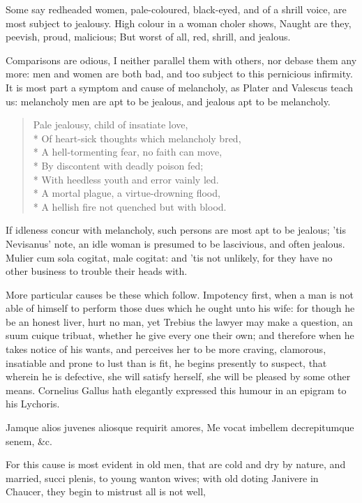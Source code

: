 {Some say redheaded women, pale-coloured, black-eyed, and of a
shrill voice, are most subject to jealousy.
High colour in a woman choler shows,
Naught are they, peevish, proud, malicious;
But worst of all, red, shrill, and jealous.

Comparisons are odious, I neither parallel them with others, nor debase
them any more: men and women are both bad, and too subject to this
pernicious infirmity. It is most part a symptom and cause of
melancholy, as Plater and Valescus teach us: melancholy men are apt to
be jealous, and jealous apt to be melancholy.

\begin{verse}
Pale jealousy, child of insatiate love,\\*
Of heart-sick thoughts which melancholy bred,\\*
A hell-tormenting fear, no faith can move,\\*
By discontent with deadly poison fed;\\*
With heedless youth and error vainly led.\\*
A mortal plague, a virtue-drowning flood,\\*
A hellish fire not quenched but with blood.
\end{verse}

If idleness concur with melancholy, such persons are most apt to be
jealous; 'tis Nevisanus' note, an idle woman is presumed to be
lascivious, and often jealous. Mulier cum sola cogitat, male cogitat:
and 'tis not unlikely, for they have no other business to trouble their
heads with.

More particular causes be these which follow. Impotency first, when a
man is not able of himself to perform those dues which he ought unto
his wife: for though he be an honest liver, hurt no man, yet Trebius
the lawyer may make a question, an suum cuique tribuat, whether he give
every one their own; and therefore when he takes notice of his wants,
and perceives her to be more craving, clamorous, insatiable and prone
to lust than is fit, he begins presently to suspect, that wherein he is
defective, she will satisfy herself, she will be pleased by some other
means. Cornelius Gallus hath elegantly expressed this humour in an
epigram to his Lychoris.

Jamque alios juvenes aliosque requirit amores,
Me vocat imbellem decrepitumque senem, \&c.

For this cause is most evident in old men, that are cold and dry by
nature, and married, succi plenis, to young wanton wives; with old
doting Janivere in Chaucer, they begin to mistrust all is not well,

}
